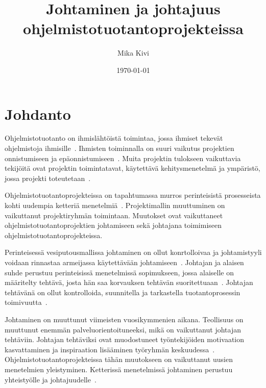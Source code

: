 \documentclass[finnish]{tktltiki2}
\title{Johtaminen ja johtajuus ohjelmistotuotantoprojekteissa}
\author{Mika Kivi}
\date{\today}
\theoremstyle{definition}
\theoremstyle{remark}
\begin{document}

\maketitle        %
\makeabstract     %

\tableofcontents  %
\thispagestyle{empty}
\newpage          %



\setcounter{page}{1}
\section{Johdanto}


Ohjelmistotuotanto on ihmislähtöistä toimintaa, jossa ihmiset tekevät ohjelmistoja ihmisille~\cite{Wang:2010:PPP:1810295.1810302}. Ihmisten toiminnalla on suuri vaikutus projektien onnistumiseen ja epäonnistumiseen~\cite{Wang:2009:PMP:1639950.1640049}. Muita projektin tulokseen vaikuttavia tekijöitä ovat projektin toimintatavat, käytettävä kehitysmenetelmä ja ympäristö, jossa projekti toteutetaan~\cite{McLeod:2011:FAS:1978802.1978803}.

Ohjelmistotuotantoprojekteissa on tapahtumassa murros perinteisistä prosesseista kohti uudempia ketteriä menetelmiä~\cite{Chow2008961}. Projektimallin muuttuminen on vaikuttanut projektiryhmän toimintaan. Muutokset ovat vaikuttaneet ohjelmistotuotantoprojektien johtamiseen sekä johtajana toimimiseen ohjelmistotuotantoprojekteissa.

Perinteisessä vesiputousmallissa johtaminen on ollut konrtolloivaa ja johtamistyyli voidaan rinnastaa armeijassa käytettävään johtamiseen~\cite{Nerur:2005:CMA:1060710.1060712}. Johtajan ja alaisen suhde perustuu perinteisissä menetelmissä sopimukseen, jossa alaiselle on määritelty tehtävä, josta hän saa korvauksen tehtävän suoritettuaan~\cite{thite2000leadership}. Johtajan tehtävänä on ollut kontrolloida, suunnitella ja tarkastella tuotantoprosessin toimivuutta~\cite{palmer2001emotional}.

Johtaminen on muuttunut viimeisten vuosikymmenien aikana. Teollisuus on muuttunut enemmän palveluorientoituneeksi, mikä on vaikuttanut johtajan tehtäviin. Johtajan tehtäviksi ovat muodostuneet työntekijöiden motivaation kasvattaminen ja inspiraation lisääminen työryhmän keskuudessa~\cite{palmer2001emotional}. Ohjelmistotuotantoprojekteissa tähän muutokseen on vaikuttanut uusien menetelmien yleistyminen. Ketterissä menetelmissä johtaminen perustuu yhteistyölle ja johtajuudelle~\cite{Nerur:2005:CMA:1060710.1060712}.
\end{document}
